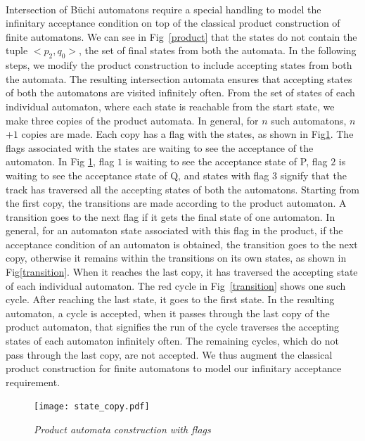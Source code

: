 ~\\
\noindent
Intersection of B\"{u}chi automatons require a special handling to model the infinitary acceptance condition on top of the classical product construction of finite automatons. We can see in Fig~\ref{product} that the states do not contain the tuple $<p_2,q_0>$, the set of final states
 from both the automata. In
 the following steps, we modify the product construction to include accepting states from
 both the automata. The resulting intersection automata ensures that accepting states of both the automatons are visited  infinitely often. From the set of states of each individual automaton, where each state is reachable from the 
 start state, we make three copies of the product automata. In general, for $n$ such automatons, $n$+$1$ copies are made.
 Each copy has a flag with the states, as shown in Fig\ref{fig:copy}. The flags associated with 
 the states are waiting to see the acceptance of the automaton.
In Fig \ref{fig:copy}, flag $1$ is waiting to see the acceptance state of P, flag $2$ is waiting to see
the acceptance state of Q, and states with flag $3$ signify that the track has traversed all the accepting states
of both the automatons. Starting from the first copy, the transitions are made according to the product automaton.
 A transition goes to the next flag if it gets the final state of one automaton. In general, for an automaton state associated with this flag in the product, if the acceptance condition of an automaton is obtained, the transition goes to the next copy, otherwise it remains within the transitions on its own states, as shown in  Fig\ref{transition}. When it reaches the last copy, it has traversed the accepting state of
 each individual automaton. The red cycle in Fig~\ref{transition} shows one such cycle. After reaching the last state, it goes to the first state. In the resulting automaton, a cycle is accepted, when it passes through the last copy
 of the product automaton, that signifies the run of the cycle traverses the accepting states of each automaton infinitely often. The remaining cycles, which do not pass through the last copy, are not accepted. We thus augment the classical product construction for finite automatons to model our infinitary acceptance requirement.
 
  \begin{figure}
\begin{center}
\texttt{[image: state\_copy.pdf]}
\end{center}
\caption{{\em Product automata construction with flags}}
\label{fig:copy}
\end{figure}

